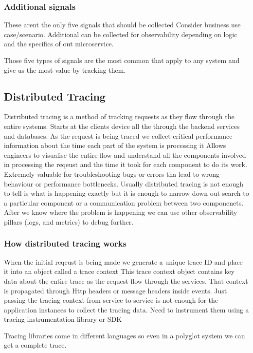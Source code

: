 \subsubsection{Additional signals}
These arent the only five signals that should be collected
Consider business use case/scenario.
Additional can be collected for observability depending on logic and the specifics of out microservice.

Those five types of signals are the most common that apply to any system and give us the most value by tracking them.

\subsection{Distributed Tracing}
Distributed tracing is a method of tracking requests as they flow through the entire systems.
Starts at the clients device all the through the backend services and databases.
As the request is being traced we collect critical performance information about the time each part of the system is processing it
Allows engineers to visualise the entire flow and understand all the components involved in processing the reqeust and the time it took for each component to do its work.
Extremely valuable for troubleshooting bugs or errors tha lead to wrong behaviour or performance bottlenecks.
Usually distributed tracing is not enough to tell is what is happening exactly but it is enough to narrow down out search to a particular component or a communication problem between two componenets.
After we know where the problem is happening we can use other observability pillars (logs, and metrics) to debug further.

\subsubsection{How distributed tracing works}
When the initial reqeust is being made we generate a unique trace ID and place it into an object called a trace context
This trace context object contains key data about the entire trace as the request flow through the services.
That context is propagated through Http headers or message headers inside events.
Just passing the tracing context from service to service is not enough for the application instances to collect the tracing data.
Need to instrument them using a tracing instrumentation library or SDK

Tracing libraries come in different languages so even in a polyglot system we can get a complete trace.

